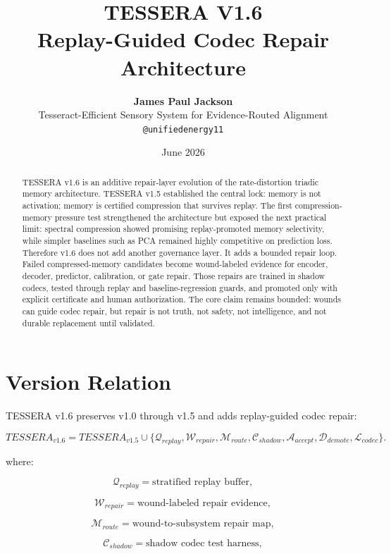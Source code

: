 \documentclass[12pt]{article}
\title{\textbf{TESSERA V1.6}\\
\large Replay-Guided Codec Repair Architecture}
\author{\textbf{James Paul Jackson}\\[4pt]
\small Tesseract-Efficient Sensory System for Evidence-Routed Alignment\\
\small \texttt{@unifiedenergy11}}
\date{June 2026}
\begin{document}
\maketitle

\begin{abstract}
TESSERA v1.6 is an additive repair-layer evolution of the rate-distortion
triadic memory architecture. TESSERA v1.5 established the central lock: memory
is not activation; memory is certified compression that survives replay. The
first compression-memory pressure test strengthened the architecture but exposed
the next practical limit: spectral compression showed promising replay-promoted
memory selectivity, while simpler baselines such as PCA remained highly
competitive on prediction loss. Therefore v1.6 does not add another governance
layer. It adds a bounded repair loop. Failed compressed-memory candidates become
wound-labeled evidence for encoder, decoder, predictor, calibration, or gate
repair. Those repairs are trained in shadow codecs, tested through replay and
baseline-regression guards, and promoted only with explicit certificate and
human authorization. The core claim remains bounded: wounds can guide codec
repair, but repair is not truth, not safety, not intelligence, and not durable
replacement until validated.
\end{abstract}

\section{Version Relation}

TESSERA v1.6 preserves v1.0 through v1.5 and adds replay-guided codec repair:

\[
\boxed{
TESSERA_{v1.6}
=
TESSERA_{v1.5}
\cup
\{\mathcal{Q}_{replay},\mathcal{W}_{repair},\mathcal{M}_{route},
\mathcal{C}_{shadow},\mathcal{A}_{accept},\mathcal{D}_{demote},\mathcal{L}_{codec}\}.
}
\]

where:

\[
\mathcal{Q}_{replay}=\text{stratified replay buffer},
\]

\[
\mathcal{W}_{repair}=\text{wound-labeled repair evidence},
\]

\[
\mathcal{M}_{route}=\text{wound-to-subsystem repair map},
\]

\[
\mathcal{C}_{shadow}=\text{shadow codec test harness},
\]
\end{document}
